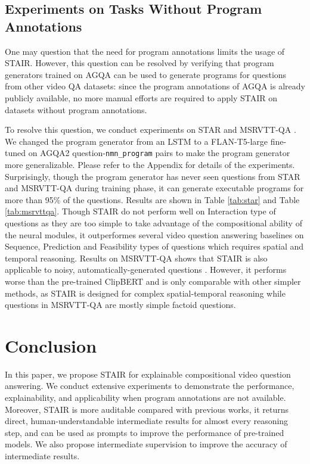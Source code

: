 \documentclass[letterpaper]{article} %
\begin{document}
\subsection{Experiments on Tasks Without Program Annotations} \label{sec:other_task}

One may question that the need for program annotations limits the usage of STAIR. However, this question can be resolved by verifying that program generators trained on AGQA can be used to generate programs for questions from other video QA datasets: since the program annotations of AGQA is already publicly available, no more manual efforts are required to apply STAIR on datasets without program annotations.

To resolve this question, we conduct experiments on STAR \cite{Wu2021STAR} and MSRVTT-QA \cite{Xu2017VideoQA}. We changed the program generator from an LSTM to a FLAN-T5-large \cite{wei2021finetunedLM} fine-tuned on AGQA2 question-\texttt{nmn\_program} pairs to make the program generator more generalizable. Please refer to the Appendix for details of the experiments. Surprisingly, though the program generator has never seen questions from STAR and MSRVTT-QA during training phase, it can generate executable programs for more than 95\% of the questions. Results are shown in Table \ref{tab:star} and Table \ref{tab:msrvttqa}. Though STAIR do not perform well on Interaction type of questions as they are too simple to take advantage of the compositional ability of the neural modules, it outperformes several video question answering baselines on Sequence, Prediction and Feasibility types of questions which requires spatial and temporal reasoning. Results on MSRVTT-QA shows that STAIR is also applicable to noisy, automatically-generated questions \cite{Lin2022TowardsFA}. However, it performs worse than the pre-trained ClipBERT and is only comparable with other simpler methods, as STAIR is designed for complex spatial-temporal reasoning while questions in MSRVTT-QA are mostly simple factoid questions.

\section{Conclusion}
In this paper, we propose STAIR for explainable compositional video question answering. We conduct extensive experiments to demonstrate the performance, explainability, and applicability when program annotations are not available. Moreover, STAIR is more auditable compared with previous works, it returns direct, human-understandable intermediate results for almost every reasoning step, and can be used as prompts to improve the performance of pre-trained models. We also propose intermediate supervision to improve the accuracy of intermediate results.
\end{document}

